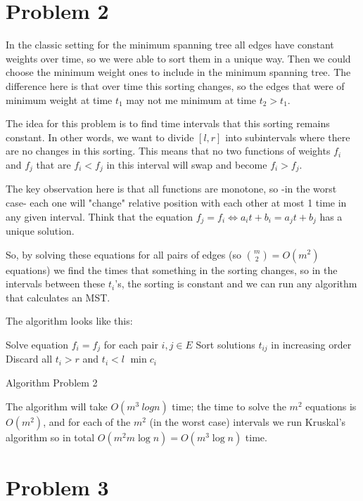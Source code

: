 \documentclass{article}
\begin{document}
\section*{Problem 2}
In the classic setting for the minimum spanning tree all edges have constant
weights over time, so we were able to sort them in a unique way. Then we could
choose the minimum weight ones to include in the minimum spanning tree. The
difference here is that over time this sorting changes, so the edges that were
of minimum weight at time $t_1$ may not me minimum at time $t_2 > t_1$. 

The idea for this problem is to find time intervals that this sorting remains
constant. In other words, we want to divide $[l,r]$ into subintervals where there
are no changes in this sorting. This means that no two functions of weights
$f_i$ and $f_j$ that are $f_i<f_j$ in this interval will swap and become
$f_i>f_j$. 

The key observation here is that all functions are monotone, so -in
the worst case- each one will "change" relative position with each other at
most 1 time in any given interval. Think that the equation $f_j = f_i
\Leftrightarrow a_it+b_i = a_jt+b_j$ has a unique solution.

So, by solving these equations for all pairs of edges (so ${m\choose 2} = O(m^2)$
equations) we find the times that something in the sorting changes, so in the
intervals between these $t_i$'s, the sorting is constant and we can run any
algorithm that calculates an MST.

The algorithm looks like this:

\begin{algorithm}[H]
Solve equation $f_i=f_j$ for each pair $i,j\in E$\;
Sort solutions $t_{ij}$ in increasing order\;
Discard all $t_i > r$ and $t_i < l$\;
\Return $\min c_i$\;
\caption{Algorithm Problem 2}
\end{algorithm}

The algorithm will take $O(m^3 \ log n)$ time; the time to solve the $m^2$
equations is $O(m^2)$, and for each of the $m^2$ (in the worst case) intervals
we run Kruskal's algorithm so in total $O(m^2 m \log n) =  O(m^3\log n)$ time.

\section*{Problem 3}
\end{document}
